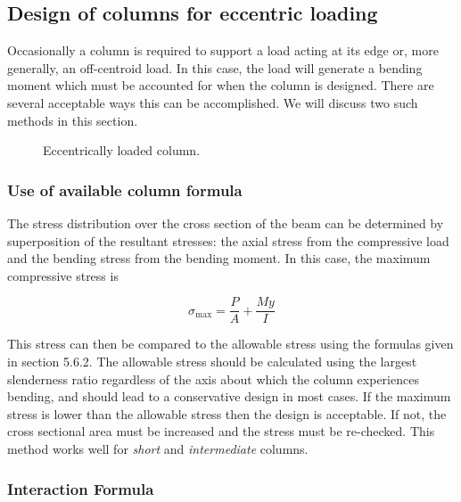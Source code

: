 \documentclass[
10pt,
a4paper,
openany,
svgnames,
]{book}
\begin{document}
\subsection{Design of columns for eccentric loading}

Occasionally a column is required to support a load acting at its edge or, more generally, an off-centroid load. In this case, the load will generate a bending moment which must be accounted for when the column is designed. There are several acceptable ways this can be accomplished. We will discuss two such methods in this section.

\begin{figure}[h]
  \centering
  \caption{Eccentrically loaded column.}
\end{figure}

\subsubsection{Use of available column formula}

The stress distribution over the cross section of the beam can be determined by superposition of the resultant stresses: the axial stress from the compressive load and the bending stress from the bending moment. In this case, the maximum compressive stress is

\begin{equation}
  {\sigma_{\max}} = \frac{P}{A} + \frac{{My}}{I}
\end{equation}

This stress can then be compared to the allowable stress using the formulas given in section 5.6.2. The allowable stress should be calculated using the largest slenderness ratio regardless of the axis about which the column experiences bending, and should lead to a conservative design in most cases. If the maximum stress is lower than the allowable stress then the design is acceptable. If not, the cross sectional area must be increased and the stress must be re-checked. This method works well for \emph{short} and \emph{intermediate} columns.

\subsubsection{Interaction Formula}
\end{document}
